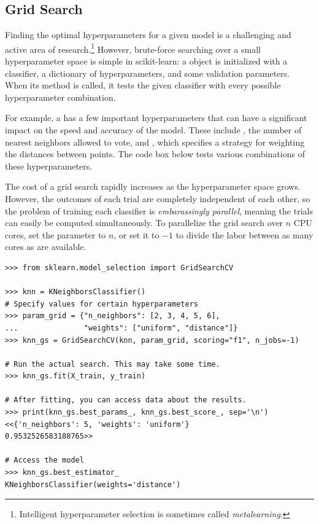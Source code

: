 \subsection*{Grid Search} %

Finding the optimal hyperparameters for a given model is a challenging and active area of research.\footnote{Intelligent hyperparameter selection is sometimes called \emph{metalearning}.}
However, brute-force searching over a small hyperparameter space is simple in scikit-learn: a  object is initialized with a classifier, a dictionary of hyperparameters, and some validation parameters.
When its  method is called, it tests the given classifier with every possible hyperparameter combination.

For example, a  has a few important hyperparameters that can have a significant impact on the speed and accuracy of the model.
These include , the number of nearest neighbors allowed to vote, and , which specifies a strategy for weighting the distances between points.
The code box below tests various combinations of these hyperparameters.

The cost of a grid search rapidly increases as the hyperparameter space grows.
However, the outcomes of each trial are completely independent of each other, so the problem of training each classifier is \emph{embarassingly parallel}, meaning the trials can easily be computed simultaneously.
To parallelize the grid search over $n$ CPU cores, set the  parameter to $n$, or set it to $-1$ to divide the labor between as many cores as are available.

\begin{lstlisting} 
>>> from sklearn.model_selection import GridSearchCV

>>> knn = KNeighborsClassifier()
# Specify values for certain hyperparameters
>>> param_grid = {"n_neighbors": [2, 3, 4, 5, 6],
...               "weights": ["uniform", "distance"]}
>>> knn_gs = GridSearchCV(knn, param_grid, scoring="f1", n_jobs=-1)

# Run the actual search. This may take some time.
>>> knn_gs.fit(X_train, y_train)

# After fitting, you can access data about the results.
>>> print(knn_gs.best_params_, knn_gs.best_score_, sep='\n')
<<{'n_neighbors': 5, 'weights': 'uniform'}
0.9532526583188765>>

# Access the model
>>> knn_gs.best_estimator_
KNeighborsClassifier(weights='distance')
\end{lstlisting}

